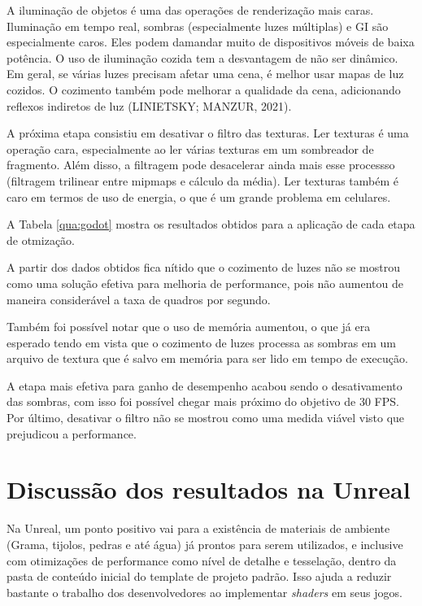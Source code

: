 A iluminação de objetos é uma das operações de renderização mais caras. Iluminação em tempo real, sombras (especialmente luzes múltiplas) e GI são especialmente caros. Eles podem damandar muito de dispositivos móveis de baixa potência. O uso de iluminação cozida tem a desvantagem de não ser dinâmico. Em geral, se várias luzes precisam afetar uma cena, é melhor usar mapas de luz cozidos. O cozimento também pode melhorar a qualidade da cena, adicionando reflexos indiretos de luz (LINIETSKY; MANZUR, 2021).

A próxima etapa consistiu em desativar o filtro das texturas. Ler texturas é uma operação cara, especialmente ao ler várias texturas em um sombreador de fragmento. Além disso, a filtragem pode desacelerar ainda mais esse processso (filtragem trilinear entre mipmaps e cálculo da média). Ler texturas também é caro em termos de uso de energia, o que é um grande problema em celulares.

A Tabela \ref{qua:godot} mostra os resultados obtidos para a aplicação de cada etapa de otmização.



A partir dos dados obtidos fica nítido que o cozimento de luzes não se mostrou como uma solução efetiva para melhoria de performance, pois não aumentou de maneira considerável a taxa de quadros por segundo. 

Também foi possível notar que o uso de memória aumentou, o que já era esperado tendo em vista que o cozimento de luzes processa as sombras em um arquivo de textura que é salvo em memória para ser lido em tempo de execução. 

A etapa mais efetiva para ganho de desempenho acabou sendo o desativamento das sombras, com isso foi possível chegar mais próximo do objetivo de 30 FPS. Por último, desativar o filtro não se mostrou como uma medida viável visto que prejudicou a performance.

\section{Discussão dos resultados na Unreal}
\label{sec:resultado-unreal}

Na Unreal, um ponto positivo vai para a existência de materiais de ambiente (Grama, tijolos, pedras e até água) já prontos para serem utilizados, e inclusive com otimizações de performance como nível de detalhe e tesselação, dentro da pasta de conteúdo inicial do template de projeto padrão. Isso ajuda a reduzir bastante o trabalho dos desenvolvedores ao implementar \textit{shaders} em seus jogos.

